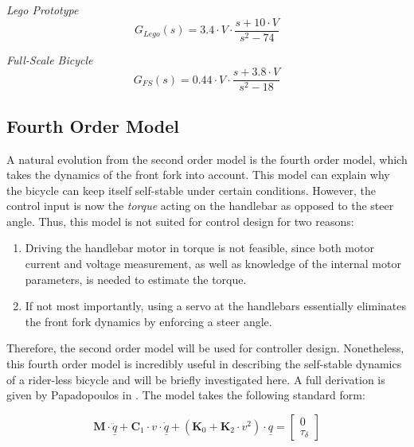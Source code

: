 \textit{Lego Prototype}
\begin{equation}
G_{Lego}(s) = 3.4 \cdot V \cdot \frac{s + 10 \cdot V}{s^2 - 74}
\label{eq:2ndOrderLego}
\end{equation}

\textit{Full-Scale Bicycle}
\begin{equation}
G_{FS}(s) = 0.44 \cdot V \cdot \frac{s + 3.8 \cdot V}{s^2 - 18}
\label{eq:2ndOrderFS}
\end{equation}

\subsection{Fourth Order Model} \label{FourthOrder}
A natural evolution from the second order model is the fourth order model, which takes the dynamics of the front fork into account. This model can explain why the bicycle can keep itself self-stable under certain conditions. However, the control input is now the \textit{torque} acting on the handlebar as opposed to the steer angle. Thus, this model is not suited for control design for two reasons: 

\begin{enumerate}
\item{Driving the handlebar motor in torque is not feasible, since both motor current and voltage measurement, as well as knowledge of the internal motor parameters, is needed to estimate the torque.}
\item{If not most importantly, using a servo at the handlebars essentially eliminates the front fork dynamics by enforcing a steer angle.}
\end{enumerate}

Therefore, the second order model will be used for controller design. Nonetheless, this fourth order model is incredibly useful in describing the self-stable dynamics of a rider-less bicycle and will be briefly investigated here. A full derivation is given by Papadopoulos in \cite{fourthorder}. The model takes the following standard form:

\begin{equation*}
\mathbf{M} \cdot \underline{\ddot{q}} + \mathbf{C}_1 \cdot v \cdot \underline{\dot{q}} + (\mathbf{K}_0 + \mathbf{K}_2 \cdot v^2) \cdot \underline{q} = \begin{bmatrix}
0 \\ \tau_{\delta}
\end{bmatrix}
\end{equation*}

